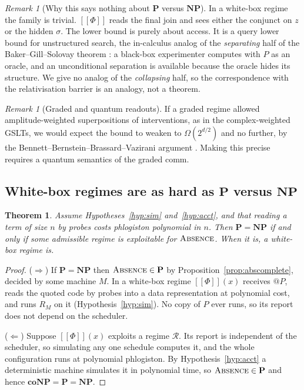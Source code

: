 \documentclass[11pt]{article}
\makeatletter
\theoremstyle{definition}
\theoremstyle{plain}
\newtheorem{theorem}[definition]{Theorem}
\theoremstyle{remark}
\newtheorem{remark}[definition]{Remark}
\newcommand{\quo}[1]{@#1}
\newcommand{\enc}[1]{[\![#1]\!]}
\newcommand{\ABS}{\textup{\textsc{Absence}}}
\newcommand{\Pclass}{\mathbf{P}}
\newcommand{\NPclass}{\mathbf{NP}}
\newcommand{\coNP}{\mathbf{coNP}}
\newcommand{\Reg}{\mathcal{R}}
\makeatother
\begin{document}
\begin{remark}[Why this says nothing about $\Pclass$ versus $\NPclass$]
\label{rem:oracle}
In a white-box regime the family is trivial. $\enc{\Phi}$ reads the final
join and sees either the conjunct on $z$ or the hidden $\sigma$. The lower
bound is purely about access. It is a query lower bound for unstructured
search, the in-calculus analog of the \emph{separating} half of the
Baker--Gill--Solovay theorem \cite{BGS75}: a black-box experimenter
computes with $P$ as an oracle, and an unconditional separation is
available because the oracle hides its structure. We give no analog of
the \emph{collapsing} half, so the correspondence with the relativisation
barrier is an analogy, not a theorem.
\end{remark}

\begin{remark}[Graded and quantum readouts]
If a graded regime allowed amplitude-weighted superpositions of
interventions, as in the complex-weighted GSLTs, we would expect the bound
to weaken to $\Omega(2^{d/2})$ and no further, by the
Bennett--Bernstein--Brassard--Vazirani argument \cite{BBBV97}. Making this
precise requires a quantum semantics of the graded comm.
\end{remark}

\subsection{White-box regimes are as hard as \texorpdfstring{$\Pclass$}{P} versus \texorpdfstring{$\NPclass$}{NP}}

\begin{theorem}\label{thm:whitebox}
Assume Hypotheses~\ref{hyp:sim} and~\ref{hyp:acct}, and that reading a
term of size $n$ by probes costs phlogiston polynomial in $n$. Then
$\Pclass = \NPclass$ if and only if some admissible regime is exploitable
for $\ABS$. When it is, a white-box regime is.
\end{theorem}

\begin{proof}
($\Rightarrow$) If $\Pclass = \NPclass$ then $\ABS \in \Pclass$ by
Proposition~\ref{prop:abscomplete}, decided by some machine $M$. In a
white-box regime $\enc{\Phi}(x)$ receives $\quo{P}$, reads the quoted code
by probes into a data representation at polynomial cost, and runs $R_M$
on it (Hypothesis~\ref{hyp:sim}). No copy of $P$ ever runs, so its report
does not depend on the scheduler.

($\Leftarrow$) Suppose $\enc{\Phi}(x)$ exploits a regime $\Reg$. Its report
is independent of the scheduler, so simulating any one schedule computes
it, and the whole configuration runs at polynomial phlogiston. By Hypothesis~\ref{hyp:acct} a deterministic
machine simulates it in polynomial time, so $\ABS \in \Pclass$ and hence
$\coNP = \Pclass = \NPclass$.
\end{proof}
\end{document}

